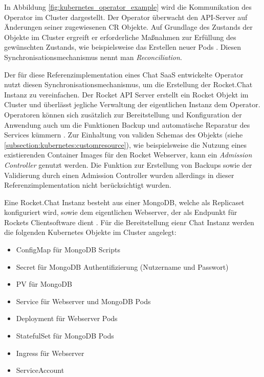 In Abbildung \ref{fig:kubernetes_operator_example} wird die Kommunikation des Operator im Cluster dargestellt.
Der Operator überwacht den API-Server auf Änderungen seiner zugewiesenen \ac{CR} Objekte.
Auf Grundlage des Zustands der Objekte im Cluster ergreift er erforderliche Maßnahmen zur Erfüllung des gewünschten Zustands,
wie beispielsweise das Erstellen neuer Pods \cite{Dobies2020}.
Diesen Synchronisationsmechanismus nennt man \emph{Reconciliation}.

Der für diese Referenzimplementation eines Chat \ac{SaaS} entwickelte Operator nutzt diesen Synchronisationsmechanismus,
um die Erstellung der Rocket.Chat Instanz zu vereinfachen.
Der Rocket API Server erstellt ein Rocket Objekt im Cluster und überlässt jegliche Verwaltung der eigentlichen Instanz dem Operator.
Operatoren können sich zusätzlich zur Bereitstellung und Konfiguration der Anwendung auch um die Funktionen Backup
und automatische Reparatur des Services kümmern \cite{Dobies2020}.
Zur Einhaltung von validen Schemas des Objekts (siehe \ref{subsection:kubernetes:customresource}),
wie beispielsweise die Nutzung eines existierenden Container Images für den Rocket Webserver,
kann ein \emph{Admission Controller} genutzt werden.
Die Funktion zur Erstellung von Backups sowie der Validierung durch einen Admission Controller
wurden allerdings in dieser Referenzimplementation nicht berücksichtigt wurden.


Eine Rocket.Chat Instanz besteht aus einer MongoDB, welche als Replicaset konfiguriert wird,
sowie dem eigentlichen Webserver, der als Endpunkt für Rockets Clientsoftware dient \cite{rocketChatDocs}.
Für die Bereitstellung eienr Chat Instanz werden die folgenden Kubernetes Objekte im Cluster angelegt:
\begin{itemize}
  \item ConfigMap für MongoDB Scripts
  \item Secret für MongoDB Authentifizierung (Nutzername und Passwort)
  \item \ac{PV} für MongoDB
  \item Service für Webserver und MongoDB Pods
  \item Deployment für Webserver Pods
  \item StatefulSet für MongoDB Pods
  \item Ingress für Webserver
  \item ServiceAccount
\end{itemize}

\newpage
